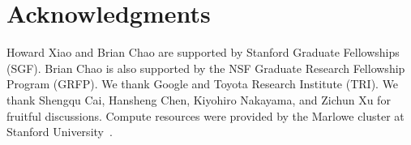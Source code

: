 \section*{Acknowledgments}
Howard Xiao and Brian Chao are supported by Stanford Graduate Fellowships (SGF). Brian Chao is also supported by the NSF Graduate Research Fellowship Program (GRFP). We thank Google and Toyota Research Institute (TRI). We thank Shengqu Cai, Hansheng Chen, Kiyohiro Nakayama, and Zichun Xu for fruitful discussions. Compute resources were provided by the Marlowe cluster at Stanford University~\cite{marlowe2025}.
